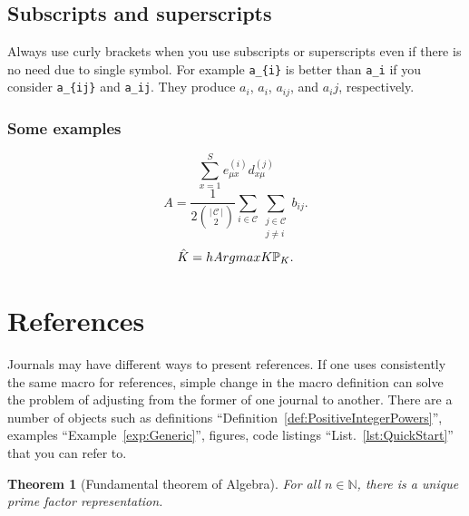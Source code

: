 \documentclass[10pt,journal,compsoc]{IEEEtran}
\newcommand{\reflst}[1]{List.~\ref{#1}}  %
\newcommand{\refdef}[1]{Definition~\ref{#1}}
\newcommand{\refexmp}[1]{Example~\ref{#1}}
\newcommand{\hAbs}[1]{\ensuremath{\left \lvert \, #1 \, \right \rvert} } %
\newcommand{\hArgmax}[2]{\underset{#1}{\operatorname{arg \, max}}\;#2}
\theoremstyle{plain}
\newtheorem{thm}{Theorem}[section]
\theoremstyle{definition}
\theoremstyle{remark}
\newcommand{\hSoN}{\mathbb{N}} %
\begin{document}
\subsection{Subscripts and superscripts}

Always use curly brackets when you use subscripts or superscripts 
even if there is no need due to single symbol.
For example \verb!a_{i}! is better than \verb!a_i! 
if you consider
\verb!a_{ij}! and \verb!a_ij!.
They produce
$a_{i}$,
$a_i$,
$a_{ij}$, and 
$a_ij$,
respectively.




\subsubsection{Some examples}

\[
	\sum_{x = 1}^{S} 
		e_{\mu x}^{(i)}
		d_{x \mu}^{(j)} 
\]
\[
	A= 	
	\frac
		{1}
		{2 {\hAbs{\mathcal{C}} \choose 2}} 
	\sum_{i \in \mathcal{C}}
	\sum_{
		\substack{
			j \in \mathcal{C}\\
			j \neq i
		}
	} 
	b_{ij}.
\]
\[
	\hat{K} =
		\\hArgmax
			{K}
			{{\mathbb{P}_{K}}}.
\]













\section{References}
\label{sec:References}

Journals may have different ways to present references. 
If one uses consistently the same macro for references,
simple change in the macro definition can solve 
the problem of adjusting from the former of one journal to another.
There are a number of objects such as 
definitions ``\refdef{def:PositiveIntegerPowers}'', 
examples ``\refexmp{exp:Generic}'',
figures, 
code listings ``\reflst{lst:QuickStart}''
 that you can refer to.

\begin{thm}[Fundamental theorem of Algebra]
	For all $n \in \hSoN$,
	there is a unique prime factor representation.
	\label{thm:PrimeFactorization}
\end{thm}
\end{document}
